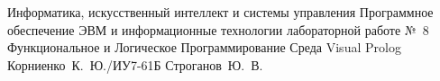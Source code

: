 \documentclass{bmstu}
\begin{document}
\makereporttitle
    {Информатика, искусственный интеллект и системы управления}
    {Программное обеспечение ЭВМ и информационные технологии}
    {лабораторной работе №~8}
    {Функциональное и Логическое Программирование}
    {Среда Visual Prolog}
    {}
    {Корниенко~К.~Ю./ИУ7-61Б}
    {Строганов~Ю.~В.}


\end{document}
